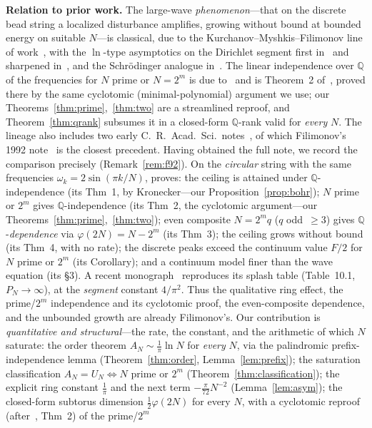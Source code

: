 \documentclass[11pt,reqno]{amsart}
\theoremstyle{plain}
\theoremstyle{definition}
\newcommand{\Q}{\mathbb{Q}}
\begin{document}
\smallskip
\noindent\textbf{Relation to prior work.} The large-wave \emph{phenomenon}---that on the discrete bead
string a localized disturbance amplifies, growing without bound at bounded energy on suitable $N$---is
classical, due to the Kurchanov--Myshkis--Filimonov line of work~\cite{KMF,MF03,FM}, with the $\ln$-type
asymptotics on the Dirichlet segment first in~\cite{FM98} and sharpened in~\cite{MF03}, and the
Schr\"odinger analogue in~\cite{F23}. The
linear independence over $\Q$ of the frequencies for $N$ prime or $N=2^m$ is due to~\cite{KMF} and is
Theorem~2 of~\cite{F92}, proved there by the same cyclotomic (minimal-polynomial) argument we use; our
Theorems~\ref{thm:prime},~\ref{thm:two} are a streamlined reproof, and Theorem~\ref{thm:qrank}
subsumes it in a closed-form $\Q$-rank valid for \emph{every} $N$. The
lineage also includes two early C.~R.~Acad.~Sci.\ notes~\cite{FKM91,F92}, of which Filimonov's 1992
note~\cite{F92} is the closest precedent. Having obtained the full note, we record the comparison
precisely (Remark~\ref{rem:f92}). On the \emph{circular} string with the same frequencies
$\omega_k=2\sin(\pi k/N)$, \cite{F92} proves: the ceiling is attained under $\Q$-independence (its Thm~1,
by Kronecker---our Proposition~\ref{prop:bohr}); $N$ prime or $2^m$ gives $\Q$-independence (its Thm~2,
the cyclotomic argument---our Theorems~\ref{thm:prime},~\ref{thm:two}); even composite $N=2^m q$
($q$ odd~$\ge3$) gives $\Q$-\emph{dependence} via $\varphi(2N)=N-2^m$ (its Thm~3); the ceiling grows
without bound (its Thm~4, with no rate); the discrete peaks exceed the continuum value $F/2$ for $N$ prime
or $2^m$ (its Corollary); and a continuum model finer than the wave equation (its \S3). A recent
monograph~\cite{AAD21} reproduces its splash table (Table~10.1, $P_N\to\infty$), at the \emph{segment}
constant $4/\pi^2$. Thus the qualitative ring effect, the prime/$2^m$ independence and its cyclotomic
proof, the even-composite dependence, and the unbounded growth are already Filimonov's.
Our contribution is \emph{quantitative and structural}---the rate, the constant, and the arithmetic of which
$N$ saturate: the order theorem $A_N\sim\tfrac1\pi\ln N$ for
\emph{every} $N$, via the palindromic prefix-independence lemma (Theorem~\ref{thm:order},
Lemma~\ref{lem:prefix}); the saturation classification $A_N=U_N\Leftrightarrow N$ prime or $2^m$
(Theorem~\ref{thm:classification}); the explicit ring constant $\tfrac1\pi$ and the
next term $-\tfrac{\pi}{72}N^{-2}$ (Lemma~\ref{lem:asym}); the closed-form subtorus dimension
$\tfrac12\varphi(2N)$ for every $N$, with a cyclotomic reproof (after~\cite{F92}, Thm~2) of the prime/$2^m$
\end{document}
